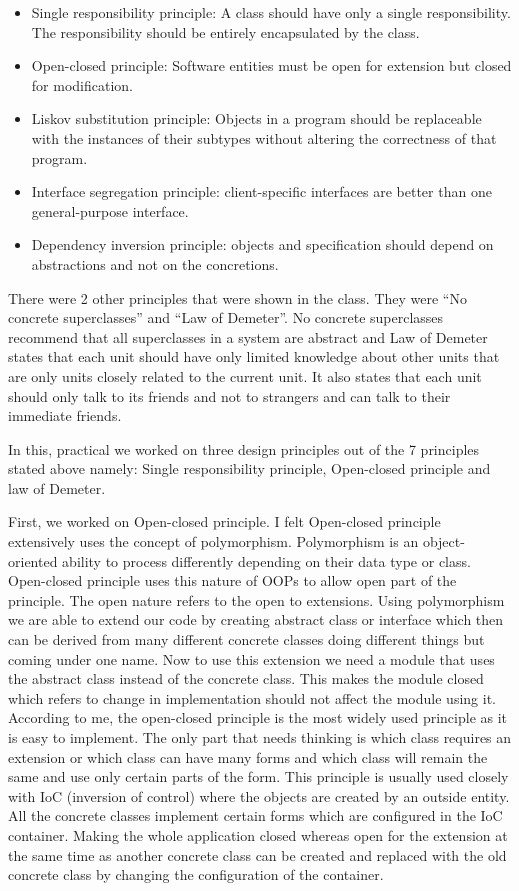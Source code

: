 \begin{itemize}
    \item Single responsibility principle: A class should have only a single responsibility. The responsibility should be entirely encapsulated by the class.
    \item Open-closed principle: Software entities must be open for extension but closed for modification.
    \item Liskov substitution principle: Objects in a program should be replaceable with the instances of their subtypes without altering the correctness of that program.
    \item Interface segregation principle: client-specific interfaces are better than one general-purpose interface.
    \item Dependency inversion principle: objects and specification should depend on abstractions and not on the concretions.
\end{itemize}

There were 2 other principles that were shown in the class. They were ``No concrete superclasses'' and ``Law of Demeter''. No concrete superclasses recommend that all superclasses in a system are abstract and Law of Demeter states that each unit should have only limited knowledge about other units that are only units closely related to the current unit. It also states that each unit should only talk to its friends and not to strangers and can talk to their immediate friends.

In this, practical we worked on three design principles out of the 7 principles stated above namely: Single responsibility principle, Open-closed principle and law of Demeter.

First, we worked on Open-closed principle. I felt Open-closed principle extensively uses the concept of polymorphism. Polymorphism is an object-oriented ability to process differently depending on their data type or class. Open-closed principle uses this nature of OOPs to allow open part of the principle. The open nature refers to the open to extensions. Using polymorphism we are able to extend our code by creating abstract class or interface which then can be derived from many different concrete classes doing different things but coming under one name. Now to use this extension we need a module that uses the abstract class instead of the concrete class. This makes the module closed which refers to change in implementation should not affect the module using it. According to me, the open-closed principle is the most widely used principle as it is easy to implement. The only part that needs thinking is which class requires an extension or which class can have many forms and which class will remain the same and use only certain parts of the form. This principle is usually used closely with IoC (inversion of control) where the objects are created by an outside entity. All the concrete classes implement certain forms which are configured in the IoC container. Making the whole application closed whereas open for the extension at the same time as another concrete class can be created and replaced with the old concrete class by changing the configuration of the container.


